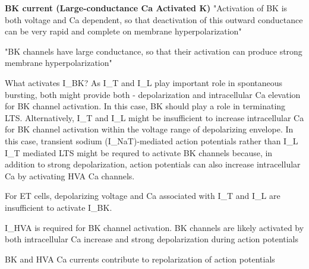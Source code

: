 \documentclass[11pt]{article}
\begin{document}




\textbf{BK current (Large-conductance Ca Activated K)}
"Activation of BK is both voltage and Ca dependent, so that deactivation of this outward
conductance can be very rapid and complete on membrane hyperpolarization" \parencite{liuMultipleConductancesCooperatively2008}        

"BK channels have large conductance, so that their activation can produce strong membrane hyperpolarization" \parencite{liuMultipleConductancesCooperatively2008}

What activates I\_BK? As I\_T and I\_L play important role in spontaneous bursting,
both might provide both - depolarization and intracellular Ca elevation for BK channel activation.
In this case, BK should play a role in terminating LTS. Alternatively, I\_T and I\_L might be insufficient
to increase intracellular Ca for BK channel activation within the voltage range of depolarizing envelope.
In this case, transient sodium (I\_NaT)-mediated action potentials rather than I\_L I\_T mediated LTS might
be requred to activate BK
channels because, in addition to strong depolarization, action potentials can also increase intracellular
Ca by activating HVA Ca channels. \parencite{liuMultipleConductancesCooperatively2008}

For ET cells, depolarizing voltage and Ca associated with I\_T and I\_L are insufficient to
activate I\_BK. \parencite{liuMultipleConductancesCooperatively2008}

I\_HVA is required for BK channel activation. BK channels are likely activated by both intracellular
Ca increase and strong depolarization during action potentials \parencite{liuMultipleConductancesCooperatively2008}

BK and HVA Ca currents contribute to repolarization of action potentials \parencite{liuMultipleConductancesCooperatively2008}
\end{document}
